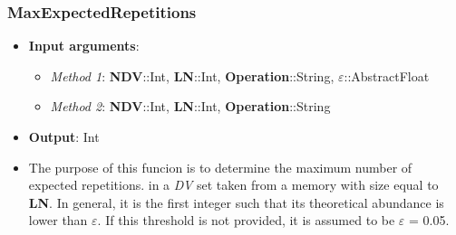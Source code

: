 \subsubsection*{MaxExpectedRepetitions}\label{Subsec:MaxExpectedRepetitions}
%
\begin{itemize}
	\item \textbf{Input arguments}: 
	\begin{itemize}
		\item \textit{Method 1}: \textbf{NDV}::Int, \textbf{LN}::Int, \textbf{Operation}::String, \(\varepsilon\)::AbstractFloat	
		\item \textit{Method 2}: \textbf{NDV}::Int, \textbf{LN}::Int, \textbf{Operation}::String
	\end{itemize}
	\item \textbf{Output}: Int
	\item The purpose of this funcion is to determine the maximum number of expected
	repetitions. in a \textit{DV} set taken from a memory with size equal to \textbf{LN}.
	In general, it is the first integer such that its theoretical abundance is
	lower than \(\varepsilon\). If this threshold is not provided, it is assumed to be \(\varepsilon\) = 0.05.
\end{itemize}
%
